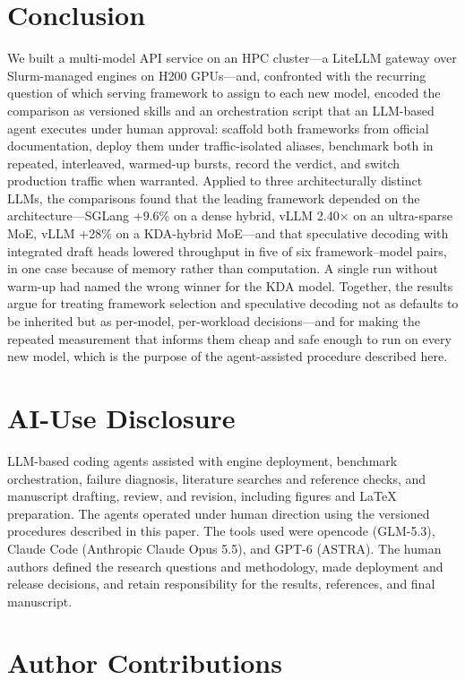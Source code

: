 \documentclass[11pt]{article}
\begin{document}
\section{Conclusion}

We built a multi-model API service on an HPC cluster---a LiteLLM gateway over Slurm-managed engines on H200 GPUs---and, confronted with the recurring question of which serving framework to assign to each new model, encoded the comparison as versioned skills and an orchestration script that an LLM-based agent executes under human approval: scaffold both frameworks from official documentation, deploy them under traffic-isolated aliases, benchmark both in repeated, interleaved, warmed-up bursts, record the verdict, and switch production traffic when warranted. Applied to three architecturally distinct LLMs, the comparisons found that the leading framework depended on the architecture---SGLang +9.6\% on a dense hybrid, vLLM 2.40$\times$ on an ultra-sparse MoE, vLLM +28\% on a KDA-hybrid MoE---and that speculative decoding with integrated draft heads lowered throughput in five of six framework--model pairs, in one case because of memory rather than computation. A single run without warm-up had named the wrong winner for the KDA model. Together, the results argue for treating framework selection and speculative decoding not as defaults to be inherited but as per-model, per-workload decisions---and for making the repeated measurement that informs them cheap and safe enough to run on every new model, which is the purpose of the agent-assisted procedure described here.

\section*{AI-Use Disclosure}

LLM-based coding agents assisted with engine deployment, benchmark orchestration, failure diagnosis, literature searches and reference checks, and manuscript drafting, review, and revision, including figures and LaTeX preparation. The agents operated under human direction using the versioned procedures described in this paper. The tools used were opencode (GLM-5.3), Claude Code (Anthropic Claude Opus 5.5), and GPT-6 (ASTRA). The human authors defined the research questions and methodology, made deployment and release decisions, and retain responsibility for the results, references, and final manuscript.

\section*{Author Contributions}
\end{document}
